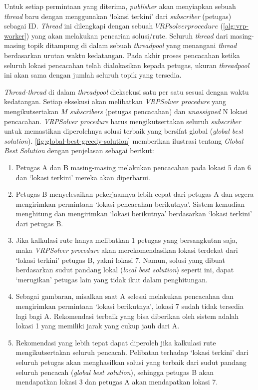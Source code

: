 Untuk setiap permintaan yang diterima, \textit{publisher} akan menyiapkan sebuah \textit{thread} baru dengan menggunakan `lokasi terkini' dari \textit{subscriber} (petugas) sebagai ID. \textit{Thread} ini dilengkapi dengan sebuah $VRP solver procedure$ (\autoref{alg:vrp-worker}) yang akan melakukan pencarian solusi/rute. Seluruh \textit{thread} dari masing-masing topik ditampung di dalam sebuah \textit{threadpool} yang menangani \textit{thread} berdasarkan urutan waktu kedatangan. Pada akhir proses pencacahan ketika seluruh lokasi pencacahan telah dialokasikan kepada petugas, ukuran \textit{threadpool} ini akan sama dengan jumlah seluruh topik yang tersedia. 


\textit{Thread-thread} di dalam \textit{threadpool} dieksekusi satu per satu sesuai dengan waktu kedatangan. Setiap eksekusi akan melibatkan \textit{VRPSolver procedure} yang mengikutsertakan $M$ \textit{subscribers} (petugas pencacahan) dan \textit{unassigned} N lokasi pencacahan. \textit{VRPSolver procedure} harus mengikutsertakan seluruh \textit{subscriber} untuk memastikan diperolehnya solusi terbaik yang bersifat global (\textit{global best solution}). \autoref{fig:global-best-greedy-solution} memberikan ilustrasi tentang \textit{Global Best Solution} dengan penjelasan sebagai berikut:
\begin{enumerate}
	\item Petugas A dan B masing-masing melakukan pencacahan pada lokasi 5 dan 6 dan `lokasi terkini' mereka akan diperbarui.
	\item Petugas B menyelesaikan pekerjaannya lebih cepat dari petugas A dan segera mengirimkan permintaan `lokasi pencacahan berikutnya'. Sistem kemudian menghitung dan mengirimkan `lokasi berikutnya' berdasarkan `lokasi terkini' dari petugas B. 
	\item Jika kalkulasi rute hanya melibatkan 1 petugas yang bersangkutan saja, maka \textit{VRPSolver procedure} akan merekomendasikan lokasi terdekat dari `lokasi terkini' petugas B, yakni lokasi 7. Namun, solusi yang dibuat berdasarkan sudut pandang lokal (\textit{local best solution}) seperti ini, dapat `merugikan' petugas lain yang tidak ikut dalam penghitungan. 
	\item Sebagai gambaran, misalkan saat A selesai melakukan pencacahan dan mengirimkan permintaan `lokasi berikutnya', lokasi 7 sudah tidak tersedia lagi bagi A. Rekomendasi terbaik yang bisa diberikan oleh sistem adalah lokasi 1 yang memiliki jarak yang cukup jauh dari A. 
	\item Rekomendasi yang lebih tepat dapat diperoleh jika kalkulasi rute mengikutsertakan seluruh pencacah. Pelibatan terhadap `lokasi terkini' dari seluruh petugas akan menghasilkan solusi yang terbaik dari sudut pandang seluruh pencacah (\textit{global best solution}), sehingga petugas B akan mendapatkan lokasi 3 dan petugas A akan mendapatkan lokasi 7. 

\end{enumerate}

